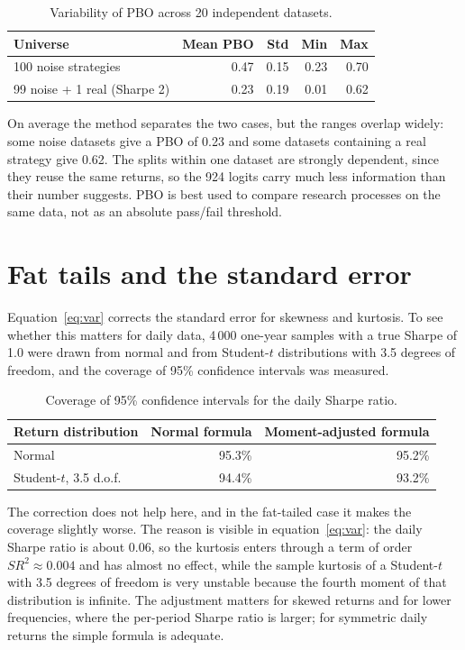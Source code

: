 \documentclass[11pt,a4paper,oneside]{report}
\begin{document}
\begin{table}[H]\centering\small
\begin{tabular}{lrrrr}
\toprule
Universe & Mean PBO & Std & Min & Max\\
\midrule
100 noise strategies & 0.47 & 0.15 & 0.23 & 0.70\\
99 noise + 1 real (Sharpe 2) & 0.23 & 0.19 & 0.01 & 0.62\\
\bottomrule
\end{tabular}
\caption{Variability of PBO across 20 independent datasets.}
\end{table}

On average the method separates the two cases, but the ranges overlap widely: some noise datasets give a PBO of 0.23 and some datasets containing a real strategy give 0.62. The splits within one dataset are strongly dependent, since they reuse the same returns, so the 924 logits carry much less information than their number suggests. PBO is best used to compare research processes on the same data, not as an absolute pass/fail threshold.

\section{Fat tails and the standard error}
Equation~\eqref{eq:var} corrects the standard error for skewness and kurtosis. To see whether this matters for daily data, 4\,000 one-year samples with a true Sharpe of 1.0 were drawn from normal and from Student-$t$ distributions with 3.5 degrees of freedom, and the coverage of 95\% confidence intervals was measured.

\begin{table}[H]\centering\small
\begin{tabular}{lrr}
\toprule
Return distribution & Normal formula & Moment-adjusted formula\\
\midrule
Normal & 95.3\% & 95.2\%\\
Student-$t$, 3.5 d.o.f. & 94.4\% & 93.2\%\\
\bottomrule
\end{tabular}
\caption{Coverage of 95\% confidence intervals for the daily Sharpe ratio.}
\end{table}

The correction does not help here, and in the fat-tailed case it makes the coverage slightly worse. The reason is visible in equation~\eqref{eq:var}: the daily Sharpe ratio is about $0.06$, so the kurtosis enters through a term of order $SR^2\approx0.004$ and has almost no effect, while the sample kurtosis of a Student-$t$ with 3.5 degrees of freedom is very unstable because the fourth moment of that distribution is infinite. The adjustment matters for skewed returns and for lower frequencies, where the per-period Sharpe ratio is larger; for symmetric daily returns the simple formula is adequate.
\end{document}
